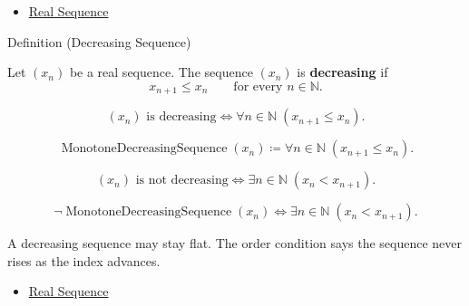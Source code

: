 \begin{dependencies}
\begin{itemize}
  \item \hyperref[def:real-sequence]{Real Sequence}
\end{itemize}
\end{dependencies}


\begin{definitionbox}{Definition (Decreasing Sequence)}
\begin{definition}
\label{def:decreasing-sequence}
Let $(x_n)$ be a real sequence. The sequence $(x_n)$ is
\textbf{decreasing} if
\[
  x_{n+1} \le x_n
  \qquad
  \text{for every } n\in\mathbb{N}.
\]
\end{definition}
\end{definitionbox}

\begin{remark*}
\[
(x_n)\text{ is decreasing}
\Longleftrightarrow
\forall n\in\mathbb{N}\;(x_{n+1}\le x_n).
\]
\end{remark*}

\begin{remark*}
\[
\operatorname{MonotoneDecreasingSequence}(x_n)
\coloneqq
\forall n\in\mathbb{N}\;(x_{n+1}\le x_n).
\]
\end{remark*}

\begin{remark*}
\[
(x_n)\text{ is not decreasing}
\Longleftrightarrow
\exists n\in\mathbb{N}\;(x_n<x_{n+1}).
\]
\end{remark*}

\begin{remark*}
\[
\neg\operatorname{MonotoneDecreasingSequence}(x_n)
\Longleftrightarrow
\exists n\in\mathbb{N}\;(x_n<x_{n+1}).
\]
\end{remark*}

\begin{remark*}[Interpretation]
A decreasing sequence may stay flat. The order condition says the sequence
never rises as the index advances.
\end{remark*}

\begin{dependencies}
\begin{itemize}
  \item \hyperref[def:real-sequence]{Real Sequence}
\end{itemize}
\end{dependencies}

